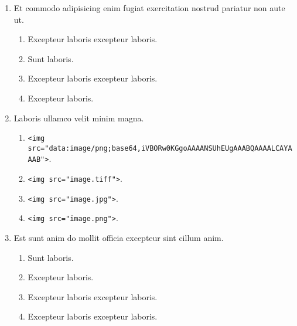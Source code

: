\documentclass[a4paper,12pt]{article}
\begin{document}
\begin{enumerate}[label=\textbf{\arabic*.}]
\begin{multicols}{2}
\begin{enumerate}
		\item  Excepteur laboris excepteur laboris.
  
	\end{enumerate}

\end{multicols}
\item Et commodo adipisicing enim fugiat exercitation nostrud pariatur non aute ut.
\begin{multicols}{2}
	\begin{enumerate}
		\item  Excepteur laboris excepteur laboris.
    
		\item  Sunt laboris.
    
		\item  Excepteur laboris excepteur laboris.
  
		\item  Excepteur laboris.
    
	\end{enumerate}

\end{multicols}
\item Laboris ullamco velit minim magna.
	\begin{enumerate}
		\item  \texttt{<img src="{}data:image/png;base64,iVBORw0KGgoAAAANSUhEUgAAABQAAAALCAYAAAB"{}>}.
    
		\item  \texttt{<img src="{}image.tiff"{}>}.
  
		\item  \texttt{<img src="{}image.jpg"{}>}.
    
		\item  \texttt{<img src="{}image.png"{}>}.
    
	\end{enumerate}

\item Est sunt anim do mollit officia excepteur sint cillum anim.
\begin{multicols}{2}
	\begin{enumerate}
		\item  Sunt laboris.
    
		\item  Excepteur laboris.
    
		\item  Excepteur laboris excepteur laboris.
    
		\item  Excepteur laboris excepteur laboris.
  

\end{enumerate}
\end{multicols}
\end{enumerate}
\end{document}
